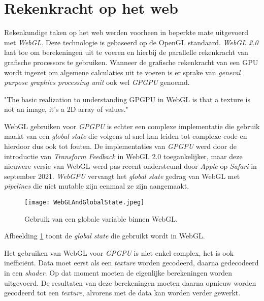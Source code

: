 \section{Rekenkracht op het web}
\label{sec:PowerOnWeb}

Rekenkundige taken op het web werden voorheen in beperkte mate uitgevoerd met \textit{WebGL}. Deze technologie is gebaseerd op de OpenGL standaard. \textit{WebGL 2.0} laat toe om berekeningen uit te voeren en hierbij de parallelle rekenkracht van grafische processors te gebruiken. Wanneer de grafische rekenkracht van een GPU wordt ingezet om algemene calculaties uit te voeren is er sprake van \textit{general purpose graphics processing unit} ook wel \textit{GPGPU} genoemd.

\begin{displayquote}
    "The basic realization to understanding GPGPU in WebGL is that a texture is not an image, it's a 2D array of values."
\end{displayquote}

WebGL gebruiken voor \textit{GPGPU} is echter een complexe implementatie die gebruik maakt van een \textit{global state} die volgens \textcite{Surma2022} al snel kan leiden tot complexe code en hierdoor dus ook tot fouten. De implementaties van \textit{GPGPU} werd door de introductie van \textit{Transform Feedback} in WebGL 2.0 toegankelijker, maar deze nieuwere versie van WebGL werd pas recent ondersteund door \textit{Apple} op \textit{Safari} in september 2021. \textit{WebGPU} vervangt het \textit{global state} gedrag van WebGL met \textit{pipelines} die niet mutable zijn eenmaal ze zijn aangemaakt. \autocite{Beaufort2023}

\begin{figure}
    \texttt{[image: WebGLAndGlobalState.jpeg]}
    \caption[De \textit{Global State} in \textit{WebGL} \autocite{GFXFundamentals2024}]{Gebruik van een globale variable binnen WebGL. \autocite{GFXFundamentals2024}}
    \label{fig:WebGL Global State}
\end{figure}

\bigbreak{}

Afbeelding \ref{fig:WebGL Global State} toont de \textit{global state} die gebruikt wordt in WebGL.

\break{}

Het gebruiken van WebGL voor \textit{GPGPU} is niet enkel complex, het is ook inefficiënt. Data moet eerst als een \textit{texture} worden gecodeerd, daarna gedecodeerd in een \textit{shader}. Op dat moment moeten de eigenlijke berekeningen worden uitgevoerd. De resultaten van deze berekeningen moeten daarna opnieuw worden gecodeerd tot een \textit{texture}, alvorens met de data kan worden verder gewerkt. \autocite{Surma2022}

